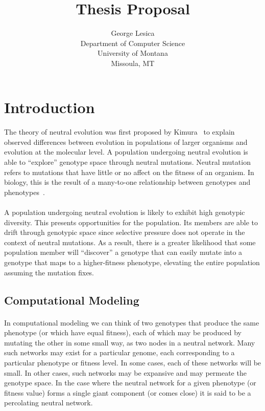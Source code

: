 \documentclass[12pt,letterpaper,titlepage,draft]{article}
\title{Thesis Proposal}
\author{George Lesica\\
Department of Computer Science\\
University of Montana\\
Missoula, MT}
\begin{document}
\maketitle

\section{Introduction}

\paragraph{}
The theory of neutral evolution was first proposed by Kimura~\cite{Kimura1984}
to explain observed differences between evolution in populations of larger
organisms and evolution at the molecular level. A population undergoing
neutral evolution is able to ``explore'' genotype space through neutral
mutations. Neutral mutation refers to mutations that have little or no affect
on the fitness of an organism. In biology, this is the result of a many-to-one
relationship between genotypes and phenotypes~\cite{Newman1998}.

\paragraph{}
A population undergoing neutral evolution is likely to exhibit high genotypic
diversity. This presents opportunities for the population. Its members are able
to drift through genotypic space since selective pressure does not operate in
the context of neutral mutations. As a result, there is a greater likelihood
that some population member will ``discover'' a genotype that can easily mutate
into a genotype that maps to a higher-fitness phenotype, elevating the entire
population assuming the mutation fixes.

\subsection{Computational Modeling}

\paragraph{}
In computational modeling we can think of two genotypes that produce the same
phenotype (or which have equal fitness), each of which may be produced by
mutating the other in some small way, as two nodes in a neutral network. Many
such networks may exist for a particular genome, each corresponding to a
particular phenotype or fitness level. In some cases, each of these networks
will be small. In other cases, such networks may be expansive and may permeate
the genotype space. In the case where the neutral network for a given phenotype
(or fitness value) forms a single giant component (or comes close) it is said
to be a percolating neutral network.
\end{document}
